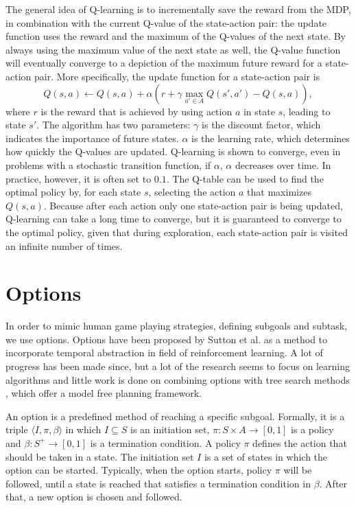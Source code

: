 The general idea of Q-learning is to incrementally save the reward from the MDP,
in combination with the current Q-value of the state-action pair: the update
function uses the reward and the maximum of the Q-values of the next state. By
always using the maximum value of the next state as well, the Q-value function
will eventually converge to a depiction of the maximum future reward for a
state-action pair. More specifically, the update function for a state-action
pair is
\begin{equation}
	\label{eq:qlearning}
	Q(s, a) \gets Q(s, a) + \alpha \left(r + \gamma \max_{a' \in A} Q(s', a') - Q(s, a)\right),
\end{equation}
where $r$ is the reward that is achieved by using action $a$ in state $s$,
leading to state $s'$. The algorithm has two parameters: $\gamma$ is the
discount factor, which indicates the importance of future states. $\alpha$ is the
learning rate, which determines how quickly the Q-values are updated.
Q-learning is shown to converge, even in problems with a stochastic transition
function, if $\alpha$, $\alpha$ decreases over time. In practice, however, it is
often set to $0.1$. The Q-table can be used to find the optimal policy by, for
each state $s$, selecting the action $a$ that maximizes $Q(s, a)$. Because after
each action only one state-action pair is being updated, Q-learning can take a
long time to converge, but it is guaranteed to converge to the optimal policy,
given that during exploration, each state-action pair is visited an infinite
number of times.

\section{Options}
\label{subsec:options}
In order to mimic human game playing strategies, defining subgoals and subtask,
we use options. Options have been proposed by Sutton et al.
\cite{sutton1999between} as a method to incorporate temporal abstraction in
field of reinforcement learning. A lot of progress has been made since, but a
lot of the research seems to focus on learning algorithms and little work is
done on combining options with tree search methods \cite{barto2003recent}, which
offer a model free planning framework.

An option is a predefined method of reaching a specific subgoal. Formally, it is
a triple $\langle I, \pi, \beta\rangle$ in which $I \subseteq S$ is an
initiation set, $\pi: S \times A \rightarrow [0, 1]$ is a policy and $\beta: S^+
\rightarrow[0,1]$ is a termination condition.  A policy $\pi$ defines the action
that should be taken in a state. The initiation set $I$ is a set of states in
which the option can be started. Typically, when the option starts, policy $\pi$
will be followed, until a state is reached that satisfies a termination
condition in $\beta$. After that, a new option is chosen and followed. 

